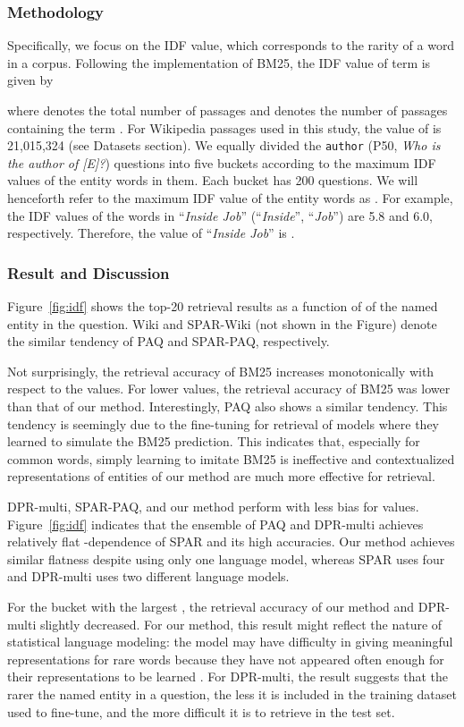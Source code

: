 \documentclass[letterpaper]{article} \usepackage{aaai23}  \usepackage{times}  \usepackage{helvet}  \usepackage{courier}  \usepackage[hyphens]{url}  \usepackage{graphicx} \urlstyle{rm} \def\UrlFont{\rm}  \usepackage{natbib}  \usepackage{caption} \frenchspacing  \setlength{\pdfpagewidth}{8.5in}  \setlength{\pdfpageheight}{11in}  \usepackage{algorithm}
\begin{document}
\subsubsection{Methodology}
Specifically, we focus on the IDF value, which corresponds to the rarity of a word in a corpus.
Following the implementation of BM25, the IDF value of term  is given by

where  denotes the total number of passages and  denotes the number of passages containing the term .
For Wikipedia passages used in this study, the value of  is 21,015,324 (see Datasets section).
We equally divided the \texttt{\small author} (P50, \textit{Who is the author of [E]?}) questions into five buckets according to the maximum IDF values of the entity words in them.
Each bucket has 200 questions.
We will henceforth refer to the maximum IDF value of the entity words as .
For example, the IDF values of the words in ``\textit{Inside Job}'' (``\textit{Inside}'', ``\textit{Job}'') are 5.8 and 6.0, respectively.
Therefore, the  value of ``\textit{Inside Job}'' is .

\subsubsection{Result and Discussion}
Figure~\ref{fig:idf} shows the top-20 retrieval results as a function of  of the named entity in the question.
Wiki  and SPAR-Wiki (not shown in the Figure) denote the similar tendency of PAQ  and SPAR-PAQ, respectively.

Not surprisingly, the retrieval accuracy of BM25 increases monotonically with respect to the  values.
For lower  values, the retrieval accuracy of BM25 was lower than that of our method.
Interestingly, PAQ  also shows a similar tendency.
This tendency is seemingly due to the fine-tuning for retrieval of  models where they learned to simulate the BM25 prediction.
This indicates that, especially for common words, simply learning to imitate BM25 is ineffective and contextualized representations of entities of our method are much more effective for retrieval.

DPR-multi, SPAR-PAQ, and our method perform with less bias for  values.
Figure~\ref{fig:idf} indicates that the ensemble of PAQ  and DPR-multi achieves relatively flat -dependence of SPAR and its high accuracies.
Our method achieves similar flatness despite using only one language model, whereas SPAR uses four and DPR-multi uses two different language models.

For the bucket with the largest , the retrieval accuracy of our method and DPR-multi slightly decreased.
For our method, this result might reflect the nature of statistical language modeling: the model may have difficulty in giving meaningful representations for rare words because they have not appeared often enough for their representations to be learned \citep[e.g.,][]{match_your_words}.
For DPR-multi, the result suggests that the rarer the named entity in a question, the less it is included in the training dataset used to fine-tune, and the more difficult it is to retrieve in the test set.
\end{document}
